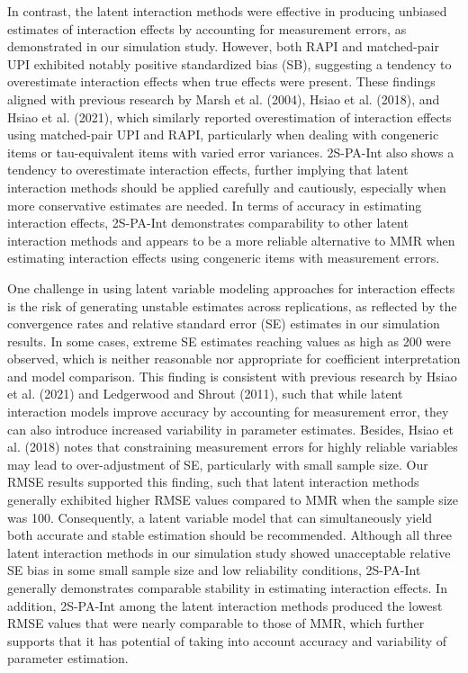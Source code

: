 \documentclass[
  man]{apa6}
\begin{document}
In contrast, the latent interaction methods were effective in producing unbiased estimates of interaction effects by accounting for measurement errors, as demonstrated in our simulation study. However, both RAPI and matched-pair UPI exhibited notably positive standardized bias (SB), suggesting a tendency to overestimate interaction effects when true effects were present. These findings aligned with previous research by Marsh et al. (2004), Hsiao et al. (2018), and Hsiao et al. (2021), which similarly reported overestimation of interaction effects using matched-pair UPI and RAPI, particularly when dealing with congeneric items or tau-equivalent items with varied error variances. 2S-PA-Int also shows a tendency to overestimate interaction effects, further implying that latent interaction methods should be applied carefully and cautiously, especially when more conservative estimates are needed. In terms of accuracy in estimating interaction effects, 2S-PA-Int demonstrates comparability to other latent interaction methods and appears to be a more reliable alternative to MMR when estimating interaction effects using congeneric items with measurement errors.

One challenge in using latent variable modeling approaches for interaction effects is the risk of generating unstable estimates across replications, as reflected by the convergence rates and relative standard error (SE) estimates in our simulation results. In some cases, extreme SE estimates reaching values as high as 200 were observed, which is neither reasonable nor appropriate for coefficient interpretation and model comparison. This finding is consistent with previous research by Hsiao et al. (2021) and Ledgerwood and Shrout (2011), such that while latent interaction models improve accuracy by accounting for measurement error, they can also introduce increased variability in parameter estimates. Besides, Hsiao et al. (2018) notes that constraining measurement errors for highly reliable variables may lead to over-adjustment of SE, particularly with small sample size. Our RMSE results supported this finding, such that latent interaction methods generally exhibited higher RMSE values compared to MMR when the sample size was 100. Consequently, a latent variable model that can simultaneously yield both accurate and stable estimation should be recommended. Although all three latent interaction methods in our simulation study showed unacceptable relative SE bias in some small sample size and low reliability conditions, 2S-PA-Int generally demonstrates comparable stability in estimating interaction effects. In addition, 2S-PA-Int among the latent interaction methods produced the lowest RMSE values that were nearly comparable to those of MMR, which further supports that it has potential of taking into account accuracy and variability of parameter estimation.
\end{document}
